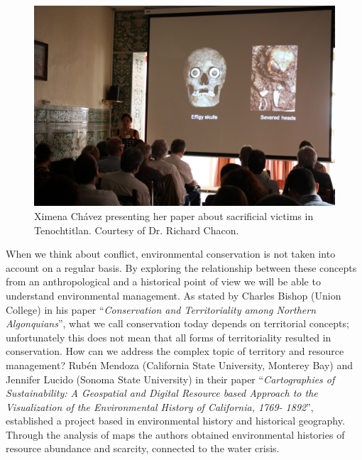 	\begin{figure}[!htb]
		\includegraphics[width=.95\linewidth]{figures/WESIPS_Fig1.jpg}
		\centering
		\caption{Ximena Chávez presenting her paper about sacrificial victims in Tenochtitlan. Courtesy of Dr. Richard Chacon.}
		\label{fig:WESIPS_Fig1}
	\end{figure}


When we think about conflict, environmental conservation is not taken into account on a regular basis. By exploring the relationship between these concepts from an anthropological and a historical point of view we will be able to understand environmental management. As stated by Charles Bishop (Union College) in his paper “\textit{Conservation and Territoriality among Northern Algonquians}”, what we call conservation today depends on territorial concepts; unfortunately this does not mean that all forms of territoriality resulted in conservation. How can we address the complex topic of territory and resource management?  Rubén Mendoza (California State University, Monterey Bay) and Jennifer Lucido (Sonoma State University) in their paper “\textit{Cartographies of Sustainability: A Geospatial and Digital Resource based Approach to the Visualization of the Environmental History of California, 1769- 1892}”, established a project based in environmental history and historical geography. Through the analysis of maps the authors obtained environmental histories of resource abundance and scarcity, connected to the water crisis. 

